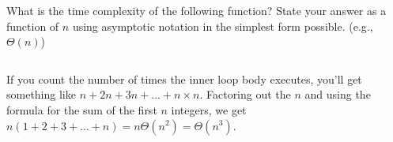 \begin{prob}
    What is the time complexity of the following function? 
    State your answer as a function of $n$ using asymptotic notation in 
    the simplest form possible. (e.g., $\Theta(n)$)

    \inputminted[lastline=4]{python}{code.py}


    \begin{soln}
        If you count the number of times the inner loop body executes, you'll get something
        like $n + 2n + 3n + \ldots + n\times n$. Factoring out the $n$ and using the
        formula for the sum of the first $n$ integers, we get
        $n (1 + 2 + 3 + \ldots + n) = n \Theta(n^2) = \Theta(n^3)$.
    \end{soln}

\end{prob}
